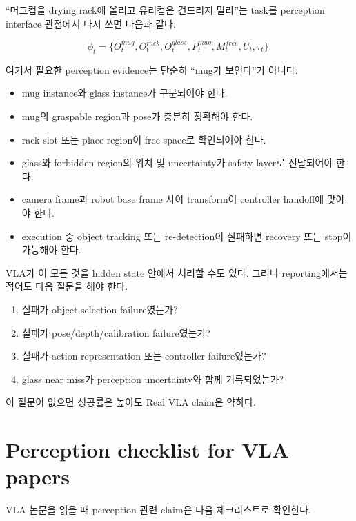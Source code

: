 ``머그컵을 drying rack에 올리고 유리컵은 건드리지 말라''는 task를 perception interface 관점에서 다시 쓰면 다음과 같다.

\begin{equation}
  \phi_t =
  \{
  O_t^{mug},
  O_t^{rack},
  O_t^{glass},
  P_t^{mug},
  M_t^{free},
  U_t,
  \tau_t
  \}.
  \label{eq:mug-perception-contract}
\end{equation}

여기서 필요한 perception evidence는 단순히 ``mug가 보인다''가 아니다.

\begin{itemize}
  \item mug instance와 glass instance가 구분되어야 한다.
  \item mug의 graspable region과 pose가 충분히 정확해야 한다.
  \item rack slot 또는 place region이 free space로 확인되어야 한다.
  \item glass와 forbidden region의 위치 및 uncertainty가 safety layer로 전달되어야 한다.
  \item camera frame과 robot base frame 사이 transform이 controller handoff에 맞아야 한다.
  \item execution 중 object tracking 또는 re-detection이 실패하면 recovery 또는 stop이 가능해야 한다.
\end{itemize}

VLA가 이 모든 것을 hidden state 안에서 처리할 수도 있다. 그러나 reporting에서는 적어도 다음 질문을 해야 한다.

\begin{enumerate}
  \item 실패가 object selection failure였는가?
  \item 실패가 pose/depth/calibration failure였는가?
  \item 실패가 action representation 또는 controller failure였는가?
  \item glass near miss가 perception uncertainty와 함께 기록되었는가?
\end{enumerate}

이 질문이 없으면 성공률은 높아도 Real VLA claim은 약하다.

\section{Perception checklist for VLA papers}

VLA 논문을 읽을 때 perception 관련 claim은 다음 체크리스트로 확인한다.

